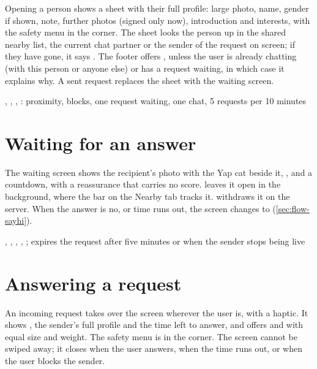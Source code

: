 Opening a person shows a sheet with their full profile: large photo, name, gender if shown, note, further
photos (signed only now), introduction and interests, with the safety menu in the corner. The sheet looks
the person up in the shared nearby list, the current chat partner or the sender of the request on screen;
if they have gone, it says . The footer offers , unless the user is
already chatting (with this person or anyone else) or has a request waiting, in which case it explains
why. A sent request replaces the sheet with the waiting screen.

\implemented
  {}
  {, , , }
  {: proximity, blocks, one request waiting, one chat, 5 requests per 10 minutes}

\section{Waiting for an answer}

The waiting screen shows the recipient's photo with the Yap cat beside it, ,
 and a countdown, with a reassurance that  carries no
score.  leaves it open in the background, where the bar on the Nearby tab tracks
it.  withdraws it on the server. When the answer is no, or time runs out, the screen
changes to  (\cref{sec:flow-sayhi}).

\implemented
  {}
  {, , , , }
  {;  expires the request after five minutes or when the sender stops being live}

\section{Answering a request}

An incoming request takes over the screen wherever the user is, with a haptic. It shows , the sender's full profile and the time left to answer, and offers  and 
with equal size and weight. The safety menu is in the corner. The screen cannot be swiped away; it closes
when the user answers, when the time runs out, or when the user blocks the sender.

